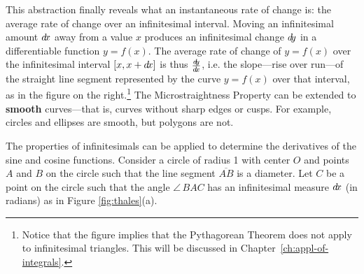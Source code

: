 This abstraction finally reveals what an instantaneous rate of change
is: the average rate of change over an infinitesimal interval. Moving an
infinitesimal amount $d\!x$ away from a value $x$ produces an infinitesimal
change $d\!y$ in a differentiable function $y=f(x)$. The average rate of change
of $y=f(x)$ over the infinitesimal interval $\lbrack x,x+d\!x \rbrack$ is thus $\frac{d\negmedspace y}{d\!x}$,
i.e. the slope---rise over run---of the straight line segment represented by
the curve $y=f(x)$ over that interval, as in the figure on the
right.\footnote{\label{ftnt:non-pythagorean}Notice that the figure implies that the Pythagorean Theorem
does not apply to infinitesimal triangles. This will be discussed in Chapter~\ref{ch:appl-of-integrals}.}
\newpage
The Microstraightness Property can be extended to \textbf{smooth} curves---that
is, curves without sharp edges or cusps. For example,
circles and ellipses are smooth, but polygons are not.

The properties of infinitesimals can be applied to determine the
derivatives of the sine and cosine functions.
Consider a circle of radius 1 with center $O$ and points
$A$ and $B$ on the circle such that the line segment $\overline{AB}$ is a
diameter. Let $C$ be a point on the circle such that the angle $\angle\,BAC$
has an infinitesimal measure $d\!x$ (in radians) as in Figure
\ref{fig:thales}(a).

